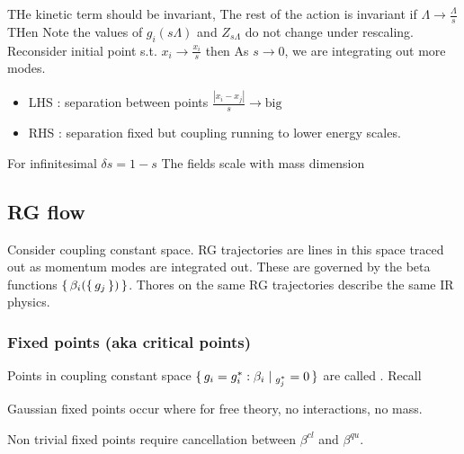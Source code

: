 \documentclass{article}
\begin{document}
THe kinetic term should be invariant, 
    The rest of the action is invariant if $\Lambda \to \frac{\Lambda}{s}$
THen
Note the values of $g_i(s\Lambda)$ and $Z_{s\Lambda}$ do not change under rescaling. \\
Reconsider initial point s.t. $x_i \to \frac{x_i}{s}$ then 
As $s \to 0$, we are integrating out  more modes. 
\begin{itemize}
    \item LHS : separation between points $\frac{|x_i - x_j|}{s} \to \text{big}$ 
    \item RHS : separation fixed but coupling running to lower energy scales. 
\end{itemize}

For infinitesimal $\delta s = 1-s$ 
The fields scale with mass dimension 

\subsection{RG flow}
Consider coupling constant space. RG trajectories are lines in this space traced out as momentum modes are integrated out. These are governed by the beta functions $\set{\beta_i(\set{g_j})}$. Thores on the same RG trajectories describe the same IR physics. 

\subsubsection*{Fixed points (aka critical points)}
Points in coupling constant space $\set{g_i = g_i^\ast : \beta_i|_{g_j^\ast}=0}$ are called . Recall 
\begin{example}
Gaussian fixed points occur where 
for free theory, no interactions, no mass. 
\end{example}
\begin{example}
Non trivial fixed points require cancellation between $\beta^{cl}$ and $\beta^{qu}$. 
\end{example}
\end{document}
